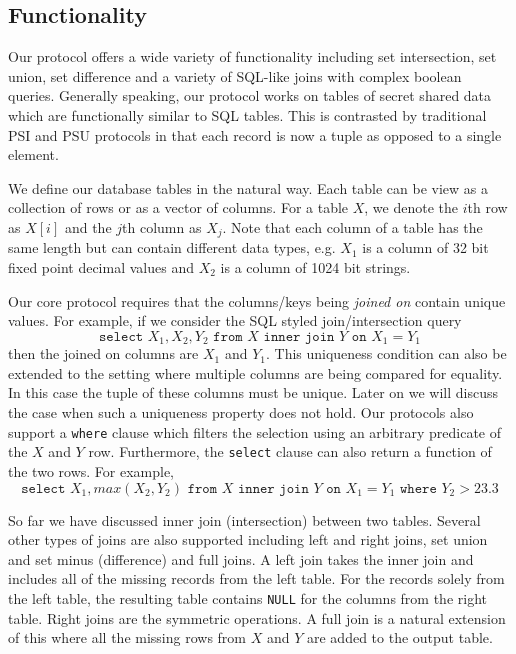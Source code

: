 \subsection{Functionality}

Our protocol offers a wide variety of functionality including set intersection, set union, set difference and a variety of SQL-like joins with complex boolean queries. Generally speaking, our protocol works on tables of secret shared data which are functionally similar to SQL tables. This is contrasted by traditional PSI and PSU protocols in that each record is now a tuple as opposed to a single element. 

We define our database tables in the natural way. Each table can be view as a collection of rows or as a vector of columns. For a table $X$, we denote the $i$th row as $X[i]$ and the $j$th column as $X_j$. Note that each column of a table has the same length but can contain different data types, e.g. $X_1$ is a column of 32 bit fixed point decimal values and $X_2$ is a column of 1024 bit strings.

Our core protocol requires that the columns/keys being \emph{joined on} contain unique values. For example, if we consider the SQL styled join/intersection query
$$
\texttt{select } X_1, X_2, Y_2 \texttt{ from } X \texttt{ inner join } Y \texttt{ on } X_1 = Y_1
$$
then the joined on columns are $X_1$ and $Y_1$. This uniqueness condition can also be extended to the setting where multiple columns are being compared for equality. In this case the tuple of these columns must be unique. Later on we will discuss the case when such a uniqueness property does not hold. Our protocols also support a \texttt{where} clause which filters the selection using an arbitrary predicate of the $X$ and $Y$ row. Furthermore, the \texttt{select} clause can also return a function of the two rows. For example,
$$
\texttt{select } X_1,max(X_2, Y_2)  \texttt{ from } X \texttt{ inner join } Y \texttt{ on } X_1 = Y_1 \texttt{ where } Y_2 > 23.3
$$

So far we have discussed inner join (intersection) between two tables. Several other types of joins are also supported including left and right joins, set union and set minus (difference) and full joins. A left join takes the inner join and includes all of the missing records from the left table. For the records solely from the left table, the resulting table contains \texttt{NULL} for the columns from the right table. Right joins are the symmetric operations. A full join is a natural extension of this where all the missing rows from $X$ and $Y$ are added to the output table.

